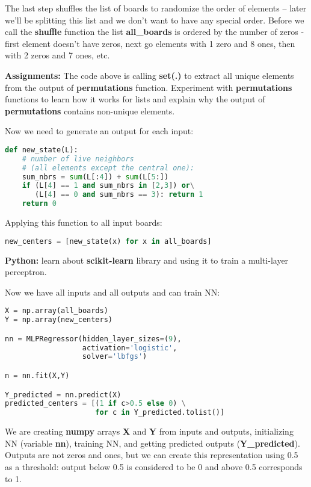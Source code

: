 The last step shuffles the list of boards to randomize the
order of elements  -- later we'll be splitting
this list and we don't want to have any special order. 
Before we call the \textbf{shuffle} function the list \textbf{all\_boards}
is ordered by the number of zeros - first element doesn't have
zeros, next go elements with 1 zero and 8 ones, then with 2 zeros and
7 ones, etc.

\begin{tcolorbox}
\textbf{Assignments:} The code above is calling \textbf{set(.)} 
to extract all unique elements from the output of \textbf{permutations}
function. Experiment with \textbf{permutations} functions
to learn how it works for lists and explain why the output of
\textbf{permutations} contains non-unique elements.
\end{tcolorbox}

Now we need to generate an output for each input:

\begin{lstlisting}[language=Python,style=codelst2,caption={New state for the central element of a board 3x3}]
def new_state(L):
    # number of live neighbors
    # (all elements except the central one):
    sum_nbrs = sum(L[:4]) + sum(L[5:])
    if (L[4] == 1 and sum_nbrs in [2,3]) or\
       (L[4] == 0 and sum_nbrs == 3): return 1
    return 0
\end{lstlisting}
Applying this function to all input boards:

\begin{lstlisting}[language=Python,style=codelst2,caption={New states for all boards}]
new_centers = [new_state(x) for x in all_boards]
\end{lstlisting}

\begin{tcolorbox}
\textbf{Python:} learn about \textbf{scikit-learn} library and
using it to train a multi-layer perceptron.
\end{tcolorbox}

Now we have all inputs and all outputs and can train NN: 

\begin{lstlisting}[language=Python,style=codelst2,caption={Training NN}]
X = np.array(all_boards)
Y = np.array(new_centers)

nn = MLPRegressor(hidden_layer_sizes=(9),
                  activation='logistic', 
                  solver='lbfgs')

n = nn.fit(X,Y)

Y_predicted = nn.predict(X)
predicted_centers = [(1 if c>0.5 else 0) \
                     for c in Y_predicted.tolist()]
\end{lstlisting}
We are creating \textbf{numpy} arrays \textbf{X} and \textbf{Y}
from inputs and outputs, initializing NN (variable \textbf{nn}),
training NN, and getting predicted outputs (\textbf{Y\_predicted}).
Outputs are not zeros and ones, but we can create this
representation using 0.5 as a threshold: output below 0.5 is
considered to be 0 and above 0.5 corresponds to 1.


